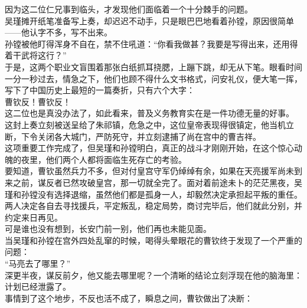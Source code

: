 \begin{multicols}{\theparacolNo}
因为这二位仁兄事到临头，才发现他们面临着一个十分棘手的问题。\\

吴瑾摊开纸笔准备写上奏，却迟迟不动手，只是眼巴巴地看着孙镗，原因很简单——他认字不多，写不出来。\\

孙镗被他盯得浑身不自在，禁不住吼道：“你看我做甚？我要是写得出来，还用得着干武将这行？”\\

于是，这两个职业文盲围着那张白纸抓耳挠腮，上蹦下跳，却无从下笔。眼看时间一分一秒过去，情急之下，他们也顾不得什么文书格式，问安礼仪，便大笔一挥，写下了中国历史上最短的一篇奏折，只有六个大字：\\

曹钦反！曹钦反！\\

这二位也是真没办法了，如此看来，普及义务教育实在是一件功德无量的好事。\\

这封上奏立刻被送呈给了朱祁镇，危急之中，这位皇帝表现得很镇定，他当机立断，下令关闭各大城门，严防死守，并立刻逮捕了尚在宫中的曹吉祥。\\

这项重要工作完成了，但吴瑾和孙镗明白，真正的战斗才刚刚开始，在这个惊心动魄的夜里，他们两个人都将面临生死存亡的考验。\\

要知道，曹钦虽然兵力不多，但对付皇宫守军仍绰绰有余，如果在天亮援军尚未到来之前，谋反者已然攻破皇宫，那一切就全完了。面对着前途未卜的茫茫黑夜，吴瑾和孙镗没有选择退缩，虽然他们都是孤身一人，却毅然决定承担起平叛的重任。\\

两人决定各自去寻找援兵，平定叛乱，稳定局势，商讨完毕后，他们就此分别，并约定来日再见。\\

可是谁也没有想到，长安门前一别，他们再也未能见面。\\

当吴瑾和孙镗在宫外四处乱窜的时候，喝得头晕眼花的曹钦终于发现了一个严重的问题：\\

“马亮去了哪里？”\\

深更半夜，谋反前夕，他又能去哪里呢？一个清晰的结论立刻浮现在他的脑海里：计划已经泄露了。\\

事情到了这个地步，不反也活不成了，瞬息之间，曹钦做出了决断：\\


\end{multicols}
